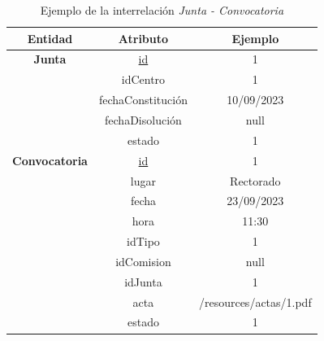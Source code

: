 \begin{itemize}
    \begin{table}[H]
    \centering
        \begin{tabular}{ | c | c | c |  }
             \hline
                 \textbf{Entidad} & \textbf{Atributo} & \textbf{Ejemplo}\\       
             \hline
                 \textbf{Junta}  & \underline{id} & 1\\
                  & idCentro & 1\\
                  & fechaConstitución & 10/09/2023\\
                  & fechaDisolución & null\\
                  & estado & 1\\
              \hline
                  \textbf{Convocatoria}  & \underline{id} & 1\\
                  & lugar & Rectorado\\
                  & fecha & 23/09/2023\\
                  & hora & 11:30\\
                  & idTipo & 1\\
                  & idComision & null\\
                  & idJunta & 1\\
                  & acta & /resources/actas/1.pdf \\
                  & estado & 1\\
        \end{tabular}
        \caption{Ejemplo de la interrelación \textit{Junta - Convocatoria}}
        \label{table:I-Ju-Conv}
    \end{table}
\end{itemize}

